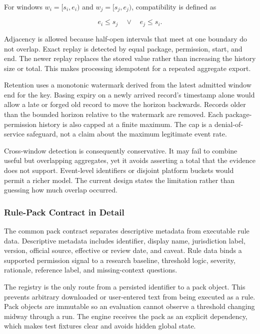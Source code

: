 For windows \(w_i=[s_i,e_i)\) and \(w_j=[s_j,e_j)\), compatibility is defined as

\begin{equation}
e_i \leq s_j \quad \lor \quad e_j \leq s_i.
\end{equation}

Adjacency is allowed because half-open intervals that meet at one boundary do not overlap. Exact replay is detected by equal package, permission, start, and end. The newer replay replaces the stored value rather than increasing the history size or total. This makes processing idempotent for a repeated aggregate export.

Retention uses a monotonic watermark derived from the latest admitted window end for the key. Basing expiry on a newly arrived record's timestamp alone would allow a late or forged old record to move the horizon backwards. Records older than the bounded horizon relative to the watermark are removed. Each package-permission history is also capped at a finite maximum. The cap is a denial-of-service safeguard, not a claim about the maximum legitimate event rate.

Cross-window detection is consequently conservative. It may fail to combine useful but overlapping aggregates, yet it avoids asserting a total that the evidence does not support. Event-level identifiers or disjoint platform buckets would permit a richer model. The current design states the limitation rather than guessing how much overlap occurred.

\subsubsection{Rule-Pack Contract in Detail}

The common pack contract separates descriptive metadata from executable rule data. Descriptive metadata includes identifier, display name, jurisdiction label, version, official source, effective or review date, and caveat. Rule data binds a supported permission signal to a research baseline, threshold logic, severity, rationale, reference label, and missing-context questions.

The registry is the only route from a persisted identifier to a pack object. This prevents arbitrary downloaded or user-entered text from being executed as a rule. Pack objects are immutable so an evaluation cannot observe a threshold changing midway through a run. The engine receives the pack as an explicit dependency, which makes test fixtures clear and avoids hidden global state.

